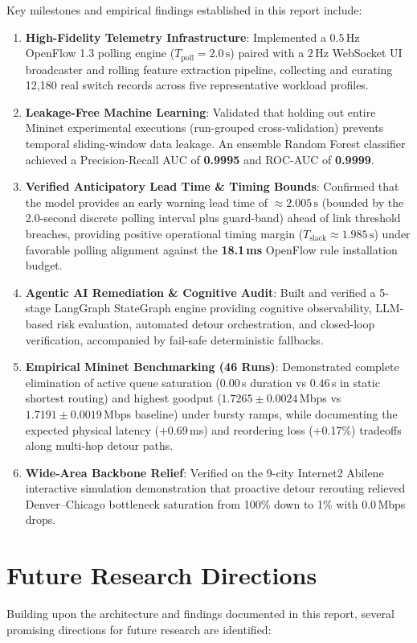 Key milestones and empirical findings established in this report include:
\begin{enumerate}
  \item \textbf{High-Fidelity Telemetry Infrastructure}: Implemented a $0.5\,\text{Hz}$ OpenFlow 1.3 polling engine ($T_{\text{poll}} = 2.0\,\text{s}$) paired with a $2\,\text{Hz}$ WebSocket UI broadcaster and rolling feature extraction pipeline, collecting and curating 12,180 real switch records across five representative workload profiles.
  \item \textbf{Leakage-Free Machine Learning}: Validated that holding out entire Mininet experimental executions (run-grouped cross-validation) prevents temporal sliding-window data leakage. An ensemble Random Forest classifier achieved a Precision-Recall AUC of \textbf{0.9995} and ROC-AUC of \textbf{0.9999}.
  \item \textbf{Verified Anticipatory Lead Time \& Timing Bounds}: Confirmed that the model provides an early warning lead time of $\approx 2.005\,\text{s}$ (bounded by the 2.0-second discrete polling interval plus guard-band) ahead of link threshold breaches, providing positive operational timing margin ($T_{\text{slack}} \approx 1.985\,\text{s}$) under favorable polling alignment against the \textbf{18.1\,ms} OpenFlow rule installation budget.
  \item \textbf{Agentic AI Remediation \& Cognitive Audit}: Built and verified a 5-stage LangGraph StateGraph engine providing cognitive observability, LLM-based risk evaluation, automated detour orchestration, and closed-loop verification, accompanied by fail-safe deterministic fallbacks.
  \item \textbf{Empirical Mininet Benchmarking (46 Runs)}: Demonstrated complete elimination of active queue saturation ($0.00$\,s duration vs $0.46$\,s in static shortest routing) and highest goodput ($1.7265 \pm 0.0024$\,Mbps vs $1.7191 \pm 0.0019$\,Mbps baseline) under bursty ramps, while documenting the expected physical latency (+0.69\,ms) and reordering loss (+0.17\%) tradeoffs along multi-hop detour paths.
  \item \textbf{Wide-Area Backbone Relief}: Verified on the 9-city Internet2 Abilene interactive simulation demonstration that proactive detour rerouting relieved Denver--Chicago bottleneck saturation from 100\% down to 1\% with 0.0\,Mbps drops.
\end{enumerate}

\section{Future Research Directions}
Building upon the architecture and findings documented in this report, several promising directions for future research are identified:


